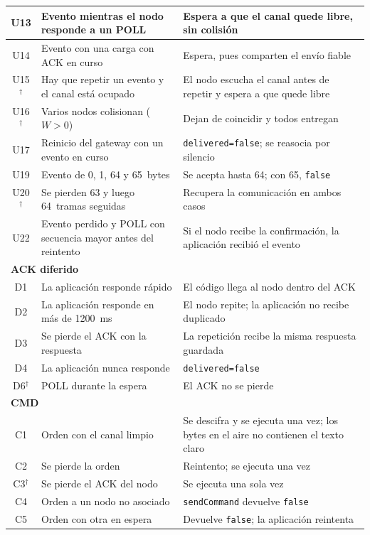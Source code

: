 {\begin{longtable}{|c|p{6.4cm}|p{6.8cm}|}
\hline
U13 & Evento mientras el nodo responde a un POLL & Espera a que el canal quede libre, sin colisión \\
\hline
U14 & Evento con una carga con ACK en curso & Espera, pues comparten el envío fiable \\
\hline
U15$^{\dagger}$ & Hay que repetir un evento y el canal está ocupado & El nodo escucha el canal antes de repetir y espera a que quede libre \\
\hline
U16$^{\dagger}$ & Varios nodos colisionan ($W > 0$) & Dejan de coincidir y todos entregan \\
\hline
U17 & Reinicio del gateway con un evento en curso & \texttt{delivered=false}; se reasocia por silencio \\
\hline
U19 & Evento de 0, 1, 64 y 65~bytes & Se acepta hasta 64; con 65, \texttt{false} \\
\hline
U20$^{\dagger}$ & Se pierden 63 y luego 64~tramas seguidas & Recupera la comunicación en ambos casos \\
\hline
U22 & Evento perdido y POLL con secuencia mayor antes del reintento & Si el nodo recibe la confirmación, la aplicación recibió el evento \\
\hline
\multicolumn{3}{|l|}{\textbf{ACK diferido}} \\
\hline
D1 & La aplicación responde rápido & El código llega al nodo dentro del ACK \\
\hline
D2 & La aplicación responde en más de 1200~ms & El nodo repite; la aplicación no recibe duplicado \\
\hline
D3 & Se pierde el ACK con la respuesta & La repetición recibe la misma respuesta guardada \\
\hline
D4 & La aplicación nunca responde & \texttt{delivered=false} \\
\hline
D6$^{\dagger}$ & POLL durante la espera & El ACK no se pierde \\
\hline
\multicolumn{3}{|l|}{\textbf{CMD}} \\
\hline
C1 & Orden con el canal limpio & Se descifra y se ejecuta una vez; los bytes en el aire no contienen el texto claro \\
\hline
C2 & Se pierde la orden & Reintento; se ejecuta una vez \\
\hline
C3$^{\dagger}$ & Se pierde el ACK del nodo & Se ejecuta una sola vez \\
\hline
C4 & Orden a un nodo no asociado & \texttt{sendCommand} devuelve \texttt{false} \\
\hline
C5 & Orden con otra en espera & Devuelve \texttt{false}; la aplicación reintenta \\

\end{longtable}}

